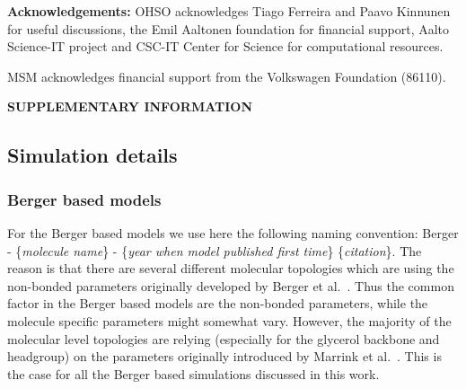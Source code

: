 \documentclass[pre,aps,floatfix,authordate1-4,twocolumn]{revtex4-1}
\begin{document}
{\bf Acknowledgements: }
OHSO acknowledges Tiago Ferreira and Paavo Kinnunen for useful discussions, the Emil Aaltonen foundation for financial support, Aalto Science-IT project and CSC-IT Center for Science for computational resources. 

MSM acknowledges  financial support from the Volkswagen Foundation (86110).



\newpage

\appendix
\begin{center}
{\bf SUPPLEMENTARY INFORMATION}
\end{center}
\subsection{Simulation details} 
\subsubsection{Berger based models}
For the Berger based models we use here the following naming convention: 
Berger - \{{\it molecule name}\} - \{{\it year when model published first time}\} \{{\it citation}\}.
The reason is that there are several different molecular topologies which are using the non-bonded parameters originally
developed by Berger et al.~\cite{berger97}. Thus the common factor in the Berger based models are the non-bonded parameters,
while the molecule specific parameters might somewhat vary. However, the majority of the molecular level topologies are 
relying (especially for the glycerol backbone and headgroup) on the parameters originally introduced by Marrink et al.~\cite{marrink98}.
This is the case for all the Berger based simulations discussed in this work.
\end{document}
